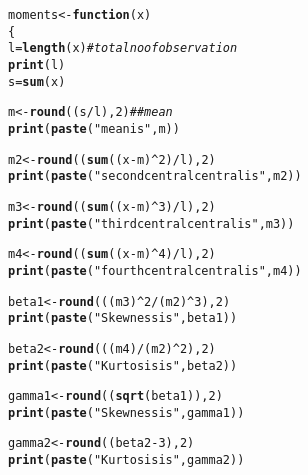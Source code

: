 \documentclass{article}\usepackage[]{graphicx}\usepackage[]{xcolor}
\makeatletter
\newcommand{\hlnum}[1]{\textcolor[rgb]{0.686,0.059,0.569}{#1}}%
\newcommand{\hlsng}[1]{\textcolor[rgb]{0.192,0.494,0.8}{#1}}%
\newcommand{\hlcom}[1]{\textcolor[rgb]{0.678,0.584,0.686}{\textit{#1}}}%
\newcommand{\hlopt}[1]{\textcolor[rgb]{0,0,0}{#1}}%
\newcommand{\hldef}[1]{\textcolor[rgb]{0.345,0.345,0.345}{#1}}%
\newcommand{\hlkwa}[1]{\textcolor[rgb]{0.161,0.373,0.58}{\textbf{#1}}}%
\newcommand{\hlkwb}[1]{\textcolor[rgb]{0.69,0.353,0.396}{#1}}%
\newcommand{\hlkwc}[1]{\textcolor[rgb]{0.333,0.667,0.333}{#1}}%
\newcommand{\hlkwd}[1]{\textcolor[rgb]{0.737,0.353,0.396}{\textbf{#1}}}%
\newenvironment{kframe}{%
 \def\at@end@of@kframe{}%
 \ifinner\ifhmode%
  \def\at@end@of@kframe{\end{minipage}}%
  \begin{minipage}{\columnwidth}%
 \fi\fi%
 \def\FrameCommand##1{\hskip\@totalleftmargin \hskip-\fboxsep
 \colorbox{shadecolor}{##1}\hskip-\fboxsep
     \hskip-\linewidth \hskip-\@totalleftmargin \hskip\columnwidth}%
 \MakeFramed {\advance\hsize-\width
   \@totalleftmargin\z@ \linewidth\hsize
   \@setminipage}}%
 {\par\unskip\endMakeFramed%
 \at@end@of@kframe}
\newenvironment{knitrout}{}{} %
\makeatother
\begin{document}
\begin{knitrout}
\color{fgcolor}\begin{kframe}
\begin{alltt}
\hldef{moments}\hlkwb{<-}\hlkwa{function}\hldef{(}\hlkwc{x}\hldef{)}
\hldef{\{}
  \hldef{l} \hlkwb{=} \hlkwd{length}\hldef{(x)} \hlcom{# total no of observation}
  \hlkwd{print}\hldef{(l)}
  \hldef{s}\hlkwb{=}\hlkwd{sum}\hldef{(x)}


  \hldef{m}\hlkwb{<-}\hlkwd{round}\hldef{((s}\hlopt{/}\hldef{l),} \hlnum{2}\hldef{)} \hlcom{## mean}
  \hlkwd{print}\hldef{(}\hlkwd{paste}\hldef{(}\hlsng{"mean is"}\hldef{, m))}

  \hldef{m2}\hlkwb{<-}\hlkwd{round}\hldef{((}\hlkwd{sum}\hldef{((x}\hlopt{-}\hldef{m)}\hlopt{^}\hlnum{2}\hldef{)}\hlopt{/}\hldef{l),}\hlnum{2}\hldef{)}
  \hlkwd{print}\hldef{(}\hlkwd{paste}\hldef{(}\hlsng{"second central central is"}\hldef{, m2))}

  \hldef{m3}\hlkwb{<-}\hlkwd{round}\hldef{((}\hlkwd{sum}\hldef{((x}\hlopt{-}\hldef{m)}\hlopt{^}\hlnum{3}\hldef{)}\hlopt{/}\hldef{l ),} \hlnum{2}\hldef{)}
  \hlkwd{print}\hldef{(}\hlkwd{paste}\hldef{(}\hlsng{"third central central is"}\hldef{, m3))}

  \hldef{m4}\hlkwb{<-}\hlkwd{round}\hldef{((}\hlkwd{sum}\hldef{((x}\hlopt{-}\hldef{m)}\hlopt{^}\hlnum{4}\hldef{)}\hlopt{/}\hldef{l ),} \hlnum{2}\hldef{)}
  \hlkwd{print}\hldef{(}\hlkwd{paste}\hldef{(}\hlsng{"fourth central central is"}\hldef{, m4))}

  \hldef{beta1} \hlkwb{<-}\hlkwd{round}\hldef{( ((m3)}\hlopt{^}\hlnum{2}\hlopt{/}\hldef{(m2)}\hlopt{^}\hlnum{3}\hldef{),}\hlnum{2}\hldef{)}
  \hlkwd{print}\hldef{(}\hlkwd{paste}\hldef{(}\hlsng{"Skewness is"}\hldef{, beta1))}

  \hldef{beta2}\hlkwb{<-}\hlkwd{round}\hldef{( ((m4)}\hlopt{/} \hldef{(m2)}\hlopt{^}\hlnum{2}\hldef{),}\hlnum{2}\hldef{)}
  \hlkwd{print}\hldef{(}\hlkwd{paste}\hldef{(}\hlsng{"Kurtosis is"}\hldef{, beta2))}

  \hldef{gamma1}\hlkwb{<-}\hlkwd{round}\hldef{( (}\hlkwd{sqrt}\hldef{(beta1)) ,} \hlnum{2}\hldef{)}
  \hlkwd{print}\hldef{(}\hlkwd{paste}\hldef{(}\hlsng{"Skewness is"}\hldef{, gamma1))}

  \hldef{gamma2}\hlkwb{<-}\hlkwd{round}\hldef{((beta2}\hlopt{-}\hlnum{3}\hldef{),}\hlnum{2}\hldef{)}
  \hlkwd{print}\hldef{(}\hlkwd{paste}\hldef{(}\hlsng{"Kurtosis is"}\hldef{, gamma2))}


\end{alltt}
\end{kframe}
\end{knitrout}
\end{document}
